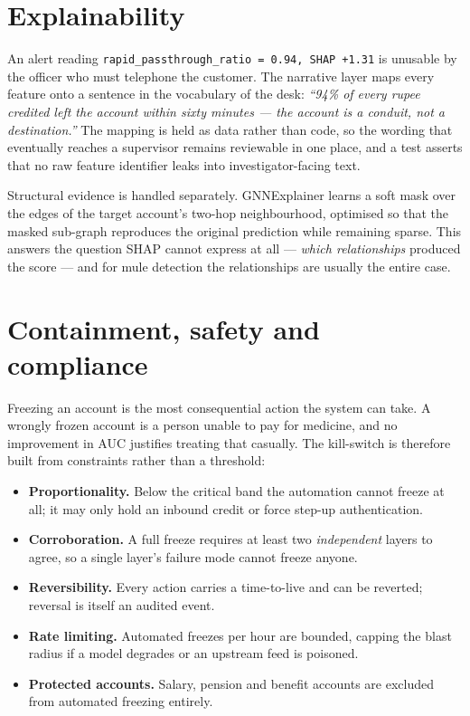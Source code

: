 \documentclass{article}
\begin{document}
\section{Explainability}
\label{sec:explain}

An alert reading \texttt{rapid\_passthrough\_ratio = 0.94, SHAP +1.31} is
unusable by the officer who must telephone the customer. The narrative layer
maps every feature onto a sentence in the vocabulary of the desk: \emph{``94\% of
every rupee credited left the account within sixty minutes --- the account is a
conduit, not a destination.''} The mapping is held as data rather than code, so
the wording that eventually reaches a supervisor remains reviewable in one
place, and a test asserts that no raw feature identifier leaks into
investigator-facing text.

Structural evidence is handled separately. GNNExplainer \cite{ying2019} learns a
soft mask over the edges of the target account's two-hop neighbourhood,
optimised so that the masked sub-graph reproduces the original prediction while
remaining sparse. This answers the question SHAP cannot express at all ---
\emph{which relationships} produced the score --- and for mule detection the
relationships are usually the entire case.

\section{Containment, safety and compliance}
\label{sec:containment}

Freezing an account is the most consequential action the system can take. A
wrongly frozen account is a person unable to pay for medicine, and no
improvement in AUC justifies treating that casually. The kill-switch is
therefore built from constraints rather than a threshold:

\begin{itemize}
\item \textbf{Proportionality.} Below the critical band the automation cannot
freeze at all; it may only hold an inbound credit or force step-up
authentication.
\item \textbf{Corroboration.} A full freeze requires at least two
\emph{independent} layers to agree, so a single layer's failure mode cannot
freeze anyone.
\item \textbf{Reversibility.} Every action carries a time-to-live and can be
reverted; reversal is itself an audited event.
\item \textbf{Rate limiting.} Automated freezes per hour are bounded, capping
the blast radius if a model degrades or an upstream feed is poisoned.
\item \textbf{Protected accounts.} Salary, pension and benefit accounts are
excluded from automated freezing entirely.
\end{itemize}
\end{document}
